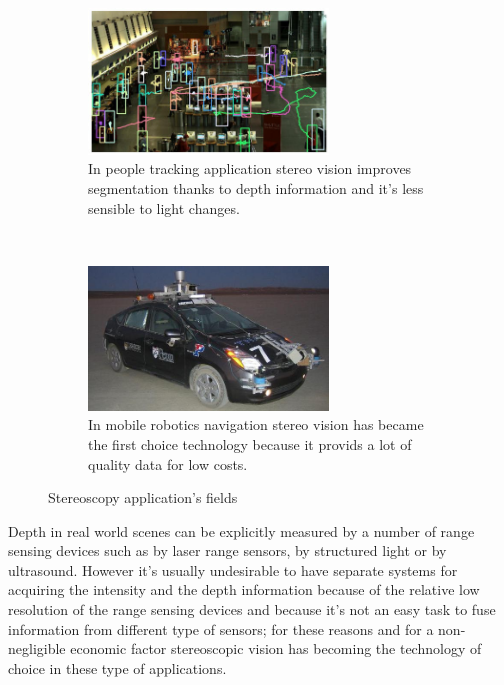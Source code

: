 \begin{figure}[h!]
\centering
\begin{subfigure}[]{0.5\textwidth}
		\centering
        \includegraphics[width=0.7\textwidth]{./img/tracking.jpg}
                \caption{\scriptsize{In people tracking application stereo vision improves segmentation thanks to depth information and it's less sensible to light changes.}}
\end{subfigure}%
~ \quad
\begin{subfigure}[]{0.5\textwidth}
		\centering
        \includegraphics[width=0.7\textwidth]{./img/little_ben.jpg}
                \caption{\scriptsize{In mobile robotics navigation stereo vision has became the first choice technology because it provids a lot of quality data for low costs.}}
\end{subfigure} 
\caption{\small{Stereoscopy application's fields}\label{appl}}
\end{figure}
Depth in real world scenes can be explicitly measured by a number of range sensing devices such as by laser range sensors, by structured light or by ultrasound. However it's usually undesirable to have separate systems for acquiring the intensity and the depth information because of the relative low resolution of the range sensing devices and because it's not an easy task to fuse information from different type of sensors; for these reasons and for a non-negligible economic factor stereoscopic vision has becoming the technology of choice in these type of applications.
